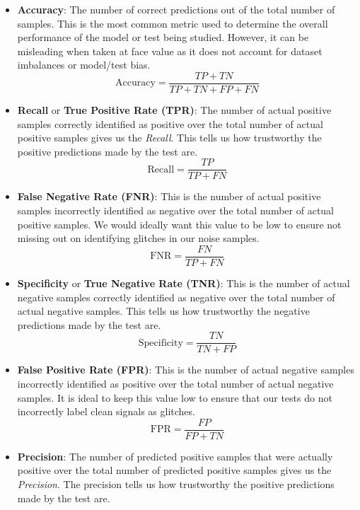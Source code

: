 \documentclass[12pt]{article}
\begin{document}
\begin{itemize}
  \item \textbf{Accuracy}: The number of correct predictions out of the total number of samples. This is the most common metric used to determine the overall performance of the model or test being studied. However, it can be misleading when taken at face value as it does not account for dataset imbalances or model/test bias.
    \begin{equation}
      \text{Accuracy} = \frac{TP + TN}{TP + TN + FP + FN}
    \end{equation}
  \item \textbf{Recall} or \textbf{True Positive Rate (TPR)}: The number of actual positive samples correctly identified as positive over the total number of actual positive samples gives us the \textit{Recall}. This tells us how trustworthy the positive predictions made by the test are.
    \begin{equation}
      \text{Recall} = \frac{TP}{TP + FN}
    \end{equation}
  \item \textbf{False Negative Rate (FNR)}: This is the number of actual positive samples incorrectly identified as negative over the total number of actual positive samples. We would ideally want this value to be low to ensure not missing out on identifying glitches in our noise samples.
    \begin{equation}
      \text{FNR} = \frac{FN}{TP + FN}
    \end{equation}
  \item \textbf{Specificity} or \textbf{True Negative Rate (TNR)}: This is the number of actual negative samples correctly identified as negative over the total number of actual negative samples. This tells us how trustworthy the negative predictions made by the test are.
    \begin{equation}
      \text{Specificity} = \frac{TN}{TN + FP}
    \end{equation}
  \item \textbf{False Positive Rate (FPR)}: This is the number of actual negative samples incorrectly identified as positive over the total number of actual negative samples. It is ideal to keep this value low to ensure that our tests do not incorrectly label clean signals as glitches.
    \begin{equation}
      \text{FPR} = \frac{FP}{FP + TN}
    \end{equation}
  \item \textbf{Precision}: The number of predicted positive samples that were actually positive over the total number of predicted positive samples gives us the \textit{Precision}. The precision tells us how trustworthy the positive predictions made by the test are.

\end{itemize}
\end{document}

